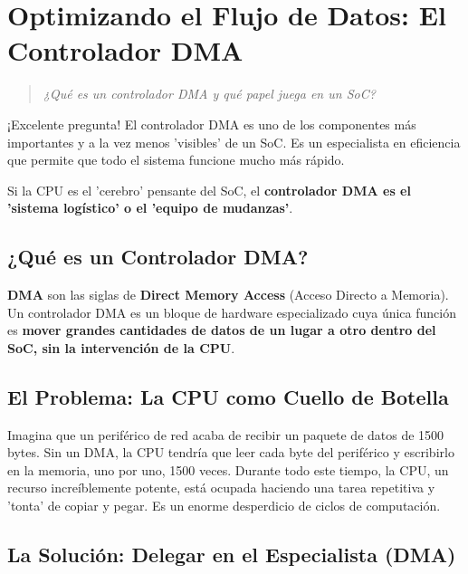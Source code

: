 \documentclass[12pt,a4paper]{article}
\newenvironment{pregunta}
  {\begin{leftbar}\begin{quote}\itshape}
  {\end{quote}\end{leftbar}}
\begin{document}
\newpage
\section{Optimizando el Flujo de Datos: El Controlador DMA}

\begin{pregunta}
¿Qué es un controlador DMA y qué papel juega en un SoC?
\end{pregunta}

¡Excelente pregunta! El controlador DMA es uno de los componentes más importantes y a la vez menos 'visibles' de un SoC. Es un especialista en eficiencia que permite que todo el sistema funcione mucho más rápido.

Si la CPU es el 'cerebro' pensante del SoC, el \textbf{controlador DMA es el 'sistema logístico' o el 'equipo de mudanzas'}.

\subsection{¿Qué es un Controlador DMA?}

\textbf{DMA} son las siglas de \textbf{Direct Memory Access} (Acceso Directo a Memoria). Un controlador DMA es un bloque de hardware especializado cuya única función es \textbf{mover grandes cantidades de datos de un lugar a otro dentro del SoC, sin la intervención de la CPU}.

\subsection{El Problema: La CPU como Cuello de Botella}

Imagina que un periférico de red acaba de recibir un paquete de datos de 1500 bytes. Sin un DMA, la CPU tendría que leer cada byte del periférico y escribirlo en la memoria, uno por uno, 1500 veces. Durante todo este tiempo, la CPU, un recurso increíblemente potente, está ocupada haciendo una tarea repetitiva y 'tonta' de copiar y pegar. Es un enorme desperdicio de ciclos de computación.

\subsection{La Solución: Delegar en el Especialista (DMA)}
\end{document}
